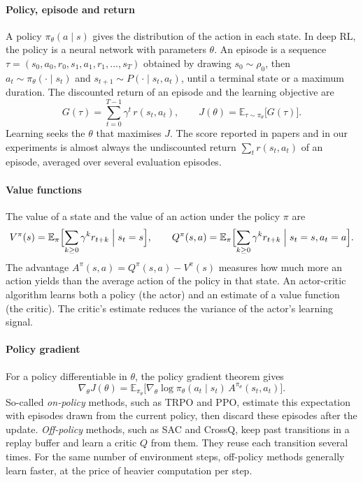 \paragraph{Policy, episode and return}
A policy $\pi_\theta(a \mid s)$ gives the distribution of the action in each state. In deep RL, the
policy is a neural network with parameters $\theta$. An episode is a sequence
$\tau = (s_0, a_0, r_0, s_1, a_1, r_1, \dots, s_T)$ obtained by drawing $s_0 \sim \rho_0$, then
$a_t \sim \pi_\theta(\cdot \mid s_t)$ and $s_{t+1} \sim P(\cdot \mid s_t, a_t)$, until a terminal
state or a maximum duration. The discounted return of an episode and the learning objective are
\begin{equation}
  G(\tau) = \sum_{t=0}^{T-1} \gamma^t \, r(s_t, a_t),
  \qquad
  J(\theta) = \mathbb{E}_{\tau \sim \pi_\theta}\bigl[ G(\tau) \bigr].
\end{equation}
Learning seeks the $\theta$ that maximises $J$. The score reported in papers and in our experiments is
almost always the undiscounted return $\sum_t r(s_t, a_t)$ of an episode, averaged over several
evaluation episodes.

\paragraph{Value functions}
The value of a state and the value of an action under the policy $\pi$ are
\begin{equation}
  V^\pi(s) = \mathbb{E}_\pi\Bigl[ \sum_{k \geq 0} \gamma^k r_{t+k} \Bigm| s_t = s \Bigr],
  \qquad
  Q^\pi(s, a) = \mathbb{E}_\pi\Bigl[ \sum_{k \geq 0} \gamma^k r_{t+k} \Bigm| s_t = s, a_t = a \Bigr].
\end{equation}
The advantage $A^\pi(s, a) = Q^\pi(s, a) - V^\pi(s)$ measures how much more an action yields than the
average action of the policy in that state. An actor-critic algorithm learns both a policy (the actor)
and an estimate of a value function (the critic). The critic's estimate reduces the variance of the
actor's learning signal.

\paragraph{Policy gradient}
For a policy differentiable in $\theta$, the policy gradient theorem \parencite{sutton2018rl} gives
\begin{equation}
  \nabla_\theta J(\theta) = \mathbb{E}_{\pi_\theta}\bigl[ \nabla_\theta \log \pi_\theta(a_t \mid s_t)\, A^{\pi_\theta}(s_t, a_t) \bigr].
\end{equation}
So-called \emph{on-policy} methods, such as TRPO and PPO, estimate this expectation with episodes drawn
from the current policy, then discard these episodes after the update. \emph{Off-policy} methods, such
as SAC and CrossQ, keep past transitions in a replay buffer and learn a critic $Q$ from them. They reuse
each transition several times. For the same number of environment steps, off-policy methods generally
learn faster, at the price of heavier computation per step.

